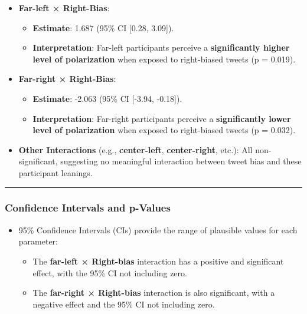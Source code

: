 \documentclass[
]{article}
\providecommand{\tightlist}{%
  \setlength{\itemsep}{0pt}\setlength{\parskip}{0pt}}
\begin{document}
\begin{itemize}
\tightlist
\item
  \textbf{Far-left × Right-Bias}:

  \begin{itemize}
  \tightlist
  \item
    \textbf{Estimate}: 1.687 (95\% CI {[}0.28, 3.09{]}).
  \item
    \textbf{Interpretation}: Far-left participants perceive a
    \textbf{significantly higher level of polarization} when exposed to
    right-biased tweets (p = 0.019).
  \end{itemize}
\item
  \textbf{Far-right × Right-Bias}:

  \begin{itemize}
  \tightlist
  \item
    \textbf{Estimate}: -2.063 (95\% CI {[}-3.94, -0.18{]}).
  \item
    \textbf{Interpretation}: Far-right participants perceive a
    \textbf{significantly lower level of polarization} when exposed to
    right-biased tweets (p = 0.032).
  \end{itemize}
\item
  \textbf{Other Interactions} (e.g., \textbf{center-left},
  \textbf{center-right}, etc.): All non-significant, suggesting no
  meaningful interaction between tweet bias and these participant
  leanings.
\end{itemize}

\begin{center}\rule{0.5\linewidth}{0.5pt}\end{center}

\subsubsection{\texorpdfstring{\textbf{Confidence Intervals and
p-Values}}{Confidence Intervals and p-Values}}\label{confidence-intervals-and-p-values}

\begin{itemize}
\tightlist
\item
  95\% Confidence Intervals (CIs) provide the range of plausible values
  for each parameter:

  \begin{itemize}
  \tightlist
  \item
    The \textbf{far-left × Right-bias} interaction has a positive and
    significant effect, with the 95\% CI not including zero.
  \item
    The \textbf{far-right × Right-bias} interaction is also significant,
    with a negative effect and the 95\% CI not including zero.
  \end{itemize}
\end{itemize}
\end{document}
